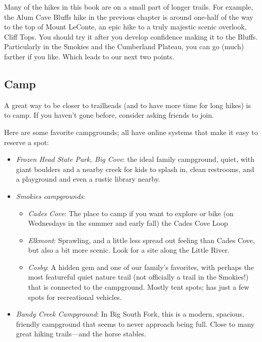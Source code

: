 \documentclass[
  letterpaper,
  DIV=11,
  numbers=noendperiod]{scrreprt}
\providecommand{\tightlist}{%
  \setlength{\itemsep}{0pt}\setlength{\parskip}{0pt}}\usepackage{longtable,booktabs,array}
\begin{document}
Many of the hikes in this book are on a small part of longer trails. For
example, the Alum Cave Bluffs hike in the previous chapter is around
one-half of the way to the top of Mount LeConte, an epic hike to a truly
majestic scenic overlook, Cliff Tops. You should try it after you
develop confidence making it to the Bluffs. Particularly in the Smokies
and the Cumberland Plateau, you can go (much) farther if you like. Which
leads to our next two points.

\subsection{Camp}\label{camp}

A great way to be closer to trailheads (and to have more time for long
hikes) is to camp. If you haven't gone before, consider asking friends
to join.

Here are some favorite campgrounds; all have online systems that make it
easy to reserve a spot:

\begin{itemize}
\tightlist
\item
  \emph{Frozen Head State Park, Big Cove}: the ideal family campground,
  quiet, with giant boulders and a nearby creek for kids to splash in,
  clean restrooms, and a playground and even a rustic library nearby.
\item
  \emph{Smokies campgrounds}:

  \begin{itemize}
  \tightlist
  \item
    \emph{Cades Cove}: The place to camp if you want to explore or bike
    (on Wednesdays in the summer and early fall) the Cades Cove Loop
  \item
    \emph{Elkmont}: Sprawling, and a little less spread out feeling than
    Cades Cove, but also a bit more scenic. Look for a site along the
    Little River.
  \item
    \emph{Cosby}: A hidden gem and one of our family's favorites, with
    perhaps the most featureful quiet nature trail (not officially a
    trail in the Smokies!) that is connected to the campground. Mostly
    tent spots; has just a few spots for recreational vehicles.
  \end{itemize}
\item
  \emph{Bandy Creek Campground}: In Big South Fork, this is a modern,
  spacious, friendly campground that seems to never approach being full.
  Close to many great hiking trails---and the horse stables.
\end{itemize}
\end{document}
